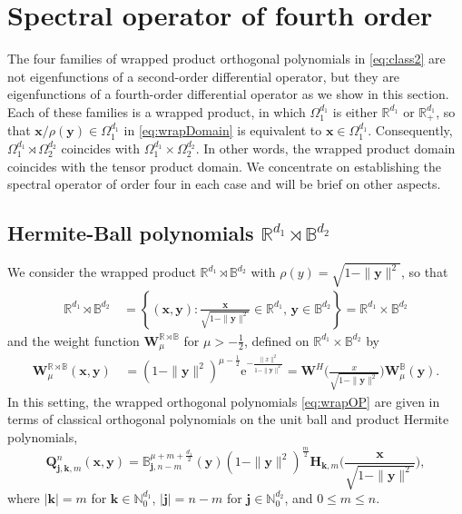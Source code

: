 \documentclass{amsart}
\theoremstyle{remark}
\def\e{\mathrm{e}}
\def\xb{{\bm x}}
\def\yb{{\bm y}}
\def\Wb{{\bm W}}
\def\BB{{\mathbb B}}
\def\NN{{\mathbb N}}
\def\RR{{\mathbb R}}
\def\f{\frac}
\begin{document}
\section{Spectral operator of fourth order} 
\setcounter{equation}{0}

The four families of wrapped product orthogonal polynomials in \eqref{eq:class2} are not eigenfunctions of 
a second-order differential operator, but they are eigenfunctions of a fourth-order differential operator as we
show in this section. Each of these families is a wrapped product, in which $\Omega_1^{d_1}$ is either
$\RR^{d_1}$ or $\RR_+^{d_1}$, so that $\xb /\rho(\yb) \in \Omega_1^{d_1}$ in \eqref{eq:wrapDomain} is
equivalent to $\xb \in \Omega_1^{d_1}$. Consequently, $\Omega_1^{d_1} \rtimes \Omega_2^{d_2}$ 
coincides with $\Omega_1^{d_1} \times \Omega_2^{d_2}$. In other words, the wrapped product domain
coincides with the tensor product domain. We concentrate on establishing the spectral operator of order four
in each case and will be brief on other aspects. 

\subsection{Hermite-Ball polynomials $\RR^{d_1}  \rtimes \BB^{d_2}$}
We consider the wrapped product  $\RR^{d_1}  \rtimes \BB^{d_2}$ with $\rho(y) = \sqrt{1-\|\yb\|^2}$, so that 
\begin{align*}
\RR^{d_1}  \rtimes \BB^{d_2}\, & = \left\{(\xb,\yb): \frac{\xb}{\sqrt{1-\|\yb\|^2}} \in  \RR^{d_1},  \, \yb \in  \BB^{d_2}\right\} 
 = \RR^{d_1} \times \BB^{d_2}
\end{align*}
and the weight function $\Wb_{\mu}^{\RR \rtimes \BB}$ for $\mu > -\f12$, defined on $\RR^{d_1} \times \BB^{d_2}$ by  
\begin{align} \label{eq:W-RB}
\Wb_{\mu}^{\RR \rtimes \BB}(\xb,\yb) \, & = (1-\|\yb\|^2)^{\mu-\f12} \e^{ - \frac{\|x\|^2}{1-\|\yb\|^2}}
   =  \Wb^H \bigg( \frac{x}{\sqrt{1-\|\yb\|^2}} \bigg)\Wb_{\mu}^\BB(\yb).
\end{align}
In this setting, the wrapped orthogonal polynomials \eqref{eq:wrapOP} are given in terms of classical orthogonal 
polynomials on the unit ball and product Hermite polynomials, 
 \begin{equation} \label{eq:OP_RB}
 \bm Q_{\bm j, \bm k, m}^n(\bm x,\bm y) = \BB_{\bm j, n-m}^{\mu+m+\frac{d_1}{2}}(\bm y) (1-\|\bm y\|^2)^{\frac{m}{2}}  
      \bm H_{\bm k, m}  \bigg(\frac{\bm x}{\sqrt{1-\|\bm y\|^2}} \bigg),
\end{equation}
where $|\bm k| = m$ for $\bm k \in \NN_0^{d_1}$, $|\bm j| = n-m$ for $\bm j \in \NN_0^{d_2}$, 
and $0 \le m  \le n$. 
\end{document}
